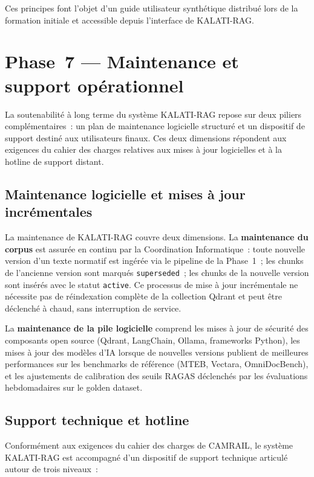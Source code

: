 \documentclass[12pt,a4paper]{report}
\begin{document}
Ces principes font l'objet d'un guide utilisateur synthétique distribué lors de la formation
initiale et accessible depuis l'interface de KALATI-RAG.

\section{Phase~7 --- Maintenance et support opérationnel}

La soutenabilité à long terme du système KALATI-RAG repose sur deux piliers complémentaires~:
un plan de maintenance logicielle structuré et un dispositif de support destiné aux utilisateurs
finaux. Ces deux dimensions répondent aux exigences du cahier des charges relatives aux mises à
jour logicielles et à la hotline de support distant.

\subsection{Maintenance logicielle et mises à jour incrémentales}

La maintenance de KALATI-RAG couvre deux dimensions. La \textbf{maintenance du corpus} est
assurée en continu par la Coordination Informatique~: toute nouvelle version d'un texte normatif
est ingérée via le pipeline de la Phase~1~; les chunks de l'ancienne version sont marqués
\texttt{superseded}~; les chunks de la nouvelle version sont insérés avec le statut
\texttt{active}. Ce processus de mise à jour incrémentale ne nécessite pas de réindexation
complète de la collection Qdrant et peut être déclenché à chaud, sans interruption de service.

La \textbf{maintenance de la pile logicielle} comprend les mises à jour de sécurité des
composants open source (Qdrant, LangChain, Ollama, frameworks Python), les mises à jour des
modèles d'IA lorsque de nouvelles versions publient de meilleures performances sur les benchmarks
de référence (MTEB, Vectara, OmniDocBench), et les ajustements de calibration des seuils RAGAS
déclenchés par les évaluations hebdomadaires sur le golden dataset.

\subsection{Support technique et hotline}

Conformément aux exigences du cahier des charges de CAMRAIL, le système KALATI-RAG est accompagné
d'un dispositif de support technique articulé autour de trois niveaux~:
\end{document}
